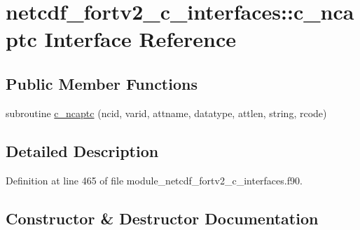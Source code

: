 \hypertarget{interfacenetcdf__fortv2__c__interfaces_1_1c__ncaptc}{}\section{netcdf\+\_\+fortv2\+\_\+c\+\_\+interfaces\+:\+:c\+\_\+ncaptc Interface Reference}
\label{interfacenetcdf__fortv2__c__interfaces_1_1c__ncaptc}
\subsection*{Public Member Functions}
\begin{DoxyCompactItemize}
\item 
subroutine \hyperlink{interfacenetcdf__fortv2__c__interfaces_1_1c__ncaptc_a6f4741f05e114ffa91bc6c0c9882b611}{c\+\_\+ncaptc} (ncid, varid, attname, datatype, attlen, string, rcode)
\end{DoxyCompactItemize}


\subsection{Detailed Description}


Definition at line 465 of file module\+\_\+netcdf\+\_\+fortv2\+\_\+c\+\_\+interfaces.\+f90.



\subsection{Constructor \& Destructor Documentation}
\mbox{\label{interfacenetcdf__fortv2__c__interfaces_1_1c__ncaptc_a6f4741f05e114ffa91bc6c0c9882b611}} 
